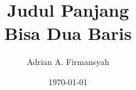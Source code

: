 \documentclass[10pt,aspectratio=169]{beamer}    %
\title[JUDUL PENDEK]{Judul Panjang \\ Bisa Dua Baris}
\author{Adrian A. Firmansyah } %
\institute[ITS] %
{\noindent
    adrianaryaputra@icloud.com\\
    6022201027\\
}
\date{\dmydate\today} %
\begin{document}
{
    \begin{frame}
        \titlepage
    \end{frame}
}
\end{document}
